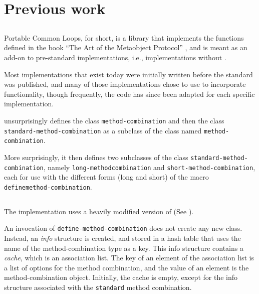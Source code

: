 \section{Previous work}

\subsection{\pcl{}}
\label{sec-pcl}

Portable Common Loops, \pcl{} for short, is a library that implements
the functions defined in the book ``The Art of the Metaobject
Protocol'' \cite{Kiczales:1991:AMP:574212}, and is meant as an add-on
to pre-standard \commonlisp{} implementations, i.e., implementations
without \clos{}.

Most \commonlisp{} implementations that exist today were initially
written before the standard was published, and many of those
implementations chose to use \pcl{} to incorporate \clos{}
functionality, though frequently, the code has since been adapted for
each specific implementation.

\pcl{} unsurprisingly defines the class \texttt{method\--combination}
and then the class \texttt{standard\--method\--combination} as a
subclass of the class named \texttt{method\--combination}.

More surprisingly, it then defines two subclasses of the class
\texttt{standard\--method\--combination}, namely
\texttt{long\--method\-combination} and
\texttt{short\--method\--combination}, each for use with the different
forms (long and short) of the macro
\texttt{define\-method\--combination}.

\subsection{\sbcl{}}

The \sbcl{} \commonlisp{} implementation uses a heavily modified
version of \pcl{} (See ).

An invocation of \texttt{define-method-combination} does not create
any new class.  Instead, an \emph{info} structure is created, and
stored in a hash table that uses the name of the method-combination
type as a key.  This info structure contains a \emph{cache}, which is
an association list.  The key of an element of the association list is
a list of options for the method combination, and the value of an
element is the method-combination object.  Initially, the cache is
empty, except for the info structure associated with the
\texttt{standard} method combination.

